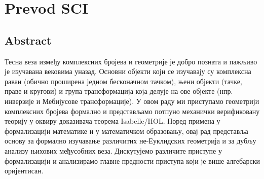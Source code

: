 \chapter{Prevod SCI}

\section{Abstract}
  Тесна веза између комплексних бројева и геометрије је добро позната
  и пажљиво је изучавана вековима уназад. Основни објекти који се
  изучавају су комплексна раван (обично проширена једном бесконачном
  тачком), њени објекти (тачке, праве и кругови) и група
  трансформација која делује на ове објекте (нпр. инверзије и
  Мебијусове трансформације).  У овом раду ми приступамо геометрији
  комплексних бројева формално и представљамо потпуно механички
  верификовану теорију у оквиру доказивача теорема Isabelle/HOL. Поред
  примена у формализацији математике и у математичком образовању, овај
  рад представља основу за формално изучавање различитих не-Еуклидских
  геометрија и за дубљу анализу њихових међусобних веза. Дискутујемо
  различите приступе у формализацији и анализирамо главне предности
  приступа који је више алгебарски оријентисан.

